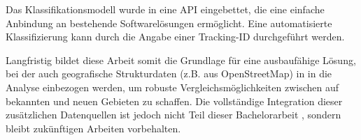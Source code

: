 \documentclass[a4paper,12pt,twoside]{scrreprt}
\begin{document}
Das Klassifikationsmodell wurde in eine API eingebettet, die eine einfache
Anbindung an bestehende Softwarelösungen ermöglicht. Eine automatisierte
Klassifizierung kann durch die Angabe einer
Tracking-ID durchgeführt werden.

Langfristig bildet diese Arbeit somit die Grundlage für eine ausbaufähige
Lösung, bei der auch geografische Strukturdaten (z.B. aus OpenStreetMap) in
in die Analyse einbezogen werden, um robuste Vergleichsmöglichkeiten zwischen
auf
bekannten und neuen Gebieten zu schaffen. Die vollständige Integration dieser
zusätzlichen Datenquellen ist jedoch nicht Teil dieser Bachelorarbeit
, sondern bleibt zukünftigen Arbeiten vorbehalten.


\end{document}
